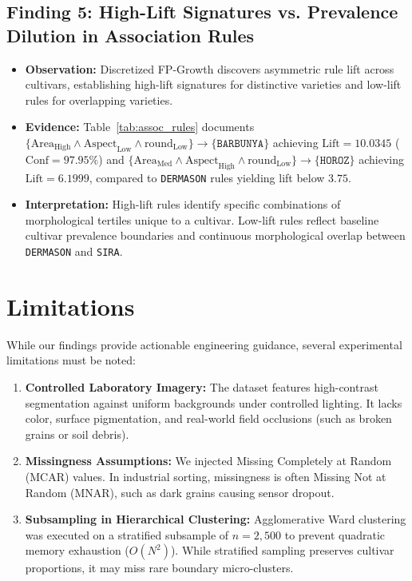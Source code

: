 \documentclass[11pt,a4paper]{article}
\begin{document}
\subsection{Finding 5: High-Lift Signatures vs. Prevalence Dilution in Association Rules}
\begin{itemize}[leftmargin=1.5em]
    \item \textbf{Observation:} Discretized FP-Growth discovers asymmetric rule lift across cultivars, establishing high-lift signatures for distinctive varieties and low-lift rules for overlapping varieties.
    \item \textbf{Evidence:} Table~\ref{tab:assoc_rules} documents $\{\text{Area}_{\text{High}} \land \text{Aspect}_{\text{Low}} \land \text{round}_{\text{Low}}\} \to \{\texttt{BARBUNYA}\}$ achieving $\text{Lift} = 10.0345$ ($\text{Conf} = 97.95\%$) and $\{\text{Area}_{\text{Med}} \land \text{Aspect}_{\text{High}} \land \text{round}_{\text{Low}}\} \to \{\texttt{HOROZ}\}$ achieving $\text{Lift} = 6.1999$, compared to \texttt{DERMASON} rules yielding lift below $3.75$.
    \item \textbf{Interpretation:} High-lift rules identify specific combinations of morphological tertiles unique to a cultivar. Low-lift rules reflect baseline cultivar prevalence boundaries and continuous morphological overlap between \texttt{DERMASON} and \texttt{SIRA}.
\end{itemize}

\section{Limitations}
\label{sec:limitations}

While our findings provide actionable engineering guidance, several experimental limitations must be noted:
\begin{enumerate}[leftmargin=1.5em]
    \item \textbf{Controlled Laboratory Imagery:} The dataset features high-contrast segmentation against uniform backgrounds under controlled lighting. It lacks color, surface pigmentation, and real-world field occlusions (such as broken grains or soil debris).
    \item \textbf{Missingness Assumptions:} We injected Missing Completely at Random (MCAR) values. In industrial sorting, missingness is often Missing Not at Random (MNAR), such as dark grains causing sensor dropout.
    \item \textbf{Subsampling in Hierarchical Clustering:} Agglomerative Ward clustering was executed on a stratified subsample of $n = 2{,}500$ to prevent quadratic memory exhaustion ($O(N^2)$). While stratified sampling preserves cultivar proportions, it may miss rare boundary micro-clusters.
\end{enumerate}
\end{document}
